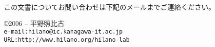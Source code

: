 \clearpage
\vspace*{\fill}

この文書についてお問い合わせは下記のメールまでご連絡ください。
\begin{flushright}
 \parbox{20em}{\copyright 2006 -- \YEAR \hspace{1zw}平野照比古\\
\texttt{e-mail:hilano@ic.kanagawa-it.ac.jp}\\
\texttt{URL:http://www.hilano.org/hilano-lab}}
\end{flushright}
\clearpage